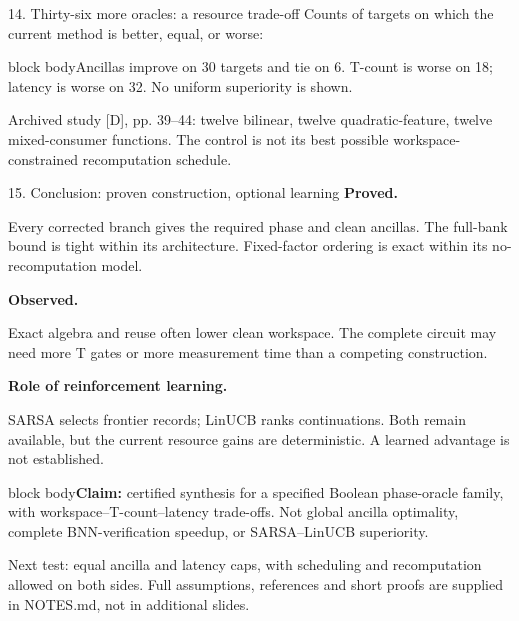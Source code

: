 \documentclass[aspectratio=169,11pt]{beamer}
\newcommand{\src}[1]{\par\vfill{\fontsize{6.6}{7.8}\selectfont\color{muted}#1\par}}
\newcommand{\takeaway}[1]{\par\smallskip\begin{beamercolorbox}[sep=1.4mm,wd=\linewidth]{block body}\small #1\end{beamercolorbox}}
\newcommand{\labeltext}[1]{{\color{accent}\bfseries #1}}
\begin{document}
\begin{frame}[t]{14. Thirty-six more oracles: a resource trade-off}
\small
Counts of targets on which the current method is better, equal, or worse:
\begin{center}
\end{center}
\vspace{-2mm}
\takeaway{Ancillas improve on 30 targets and tie on 6. T-count is worse on 18; latency is worse on 32. No uniform superiority is shown.}
\src{Archived study [D], pp. 39--44: twelve bilinear, twelve quadratic-feature, twelve mixed-consumer functions. The control is not its best possible workspace-constrained recomputation schedule.}
\end{frame}

\begin{frame}[t]{15. Conclusion: proven construction, optional learning}
\small
\labeltext{Proved.}\par
Every corrected branch gives the required phase and clean ancillas. The full-bank bound is tight within its architecture. Fixed-factor ordering is exact within its no-recomputation model.

\medskip
\labeltext{Observed.}\par
Exact algebra and reuse often lower clean workspace. The complete circuit may need more T gates or more measurement time than a competing construction.

\medskip
\labeltext{Role of reinforcement learning.}\par
SARSA selects frontier records; LinUCB ranks continuations. Both remain available, but the current resource gains are deterministic. A learned advantage is not established.
\takeaway{\textbf{Claim:} certified synthesis for a specified Boolean phase-oracle family, with workspace--T-count--latency trade-offs. Not global ancilla optimality, complete BNN-verification speedup, or SARSA--LinUCB superiority.}
\src{Next test: equal ancilla and latency caps, with scheduling and recomputation allowed on both sides. Full assumptions, references and short proofs are supplied in NOTES.md, not in additional slides.}
\end{frame}
\end{document}
